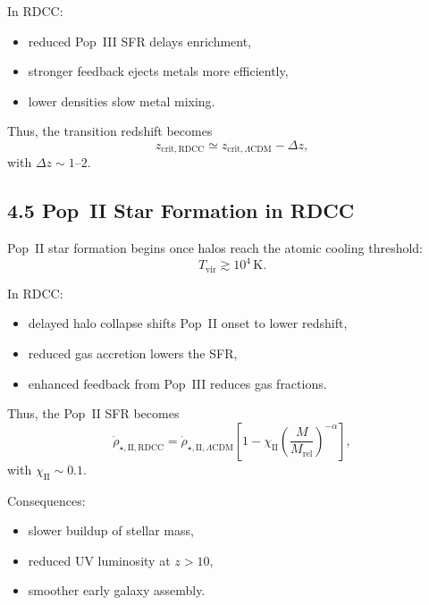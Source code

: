 \documentclass[11pt,a4paper]{article}
\begin{document}
In RDCC:

\begin{itemize}
    \item reduced Pop~III SFR delays enrichment,
    \item stronger feedback ejects metals more efficiently,
    \item lower densities slow metal mixing.
\end{itemize}

Thus, the transition redshift becomes
\begin{equation}
    z_{\mathrm{crit,RDCC}}
    \simeq z_{\mathrm{crit},\Lambda\mathrm{CDM}} - \Delta z,
\end{equation}
with $\Delta z \sim 1$--$2$.

\subsection*{4.5 Pop~II Star Formation in RDCC}

Pop~II star formation begins once halos reach the atomic cooling threshold:
\begin{equation}
    T_{\mathrm{vir}} \gtrsim 10^4\,\mathrm{K}.
\end{equation}

In RDCC:

\begin{itemize}
    \item delayed halo collapse shifts Pop~II onset to lower redshift,
    \item reduced gas accretion lowers the SFR,
    \item enhanced feedback from Pop~III reduces gas fractions.
\end{itemize}

Thus, the Pop~II SFR becomes
\begin{equation}
    \dot{\rho}_{\star,\mathrm{II,RDCC}}
    = \dot{\rho}_{\star,\mathrm{II},\Lambda\mathrm{CDM}}
      \left[
        1 - \chi_{\mathrm{II}}
        \left(\frac{M}{M_{\mathrm{rel}}}\right)^{-\alpha}
      \right],
\end{equation}
with $\chi_{\mathrm{II}} \sim 0.1$.

Consequences:

\begin{itemize}
    \item slower buildup of stellar mass,
    \item reduced UV luminosity at $z > 10$,
    \item smoother early galaxy assembly.
\end{itemize}
\end{document}
